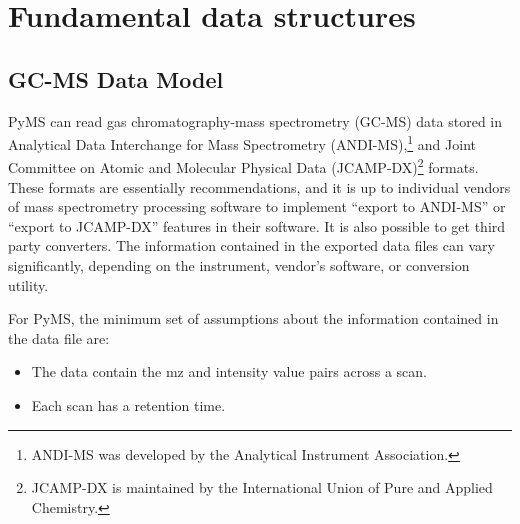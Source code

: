 

\chapter{Fundamental data structures}

\section{GC-MS Data Model}

PyMS can read gas chromatography-mass spectrometry (GC-MS) data stored in
Analytical Data Interchange for Mass Spectrometry (ANDI-MS),\footnote{ANDI-MS
was developed by the Analytical Instrument Association.} and Joint Committee on
Atomic and Molecular Physical Data (JCAMP-DX)\footnote{JCAMP-DX is maintained by
the International Union of Pure and Applied Chemistry.} formats. These formats
are essentially recommendations, and it is up to individual vendors of mass
spectrometry processing software to implement ``export to ANDI-MS'' or ``export
to JCAMP-DX'' features in their software. It is also possible to get third party
converters. The information contained in the exported data files
can vary significantly, depending on the instrument, vendor's software, or
conversion utility.

For PyMS, the minimum set of assumptions about the information contained in the
data file are:
\begin{itemize}
    \item The data contain the mz and intensity value pairs across a scan.
    \item Each scan has a retention time.
\end{itemize}

